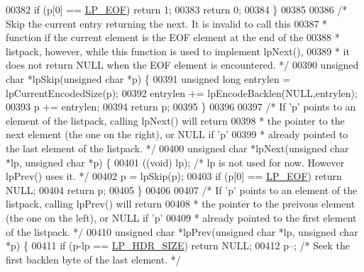 \begin{DoxyCode}
00382     \textcolor{keywordflow}{if} (p[0] == \hyperlink{listpack_8c_aa11b422dc597c4352da2abf522692774}{LP\_EOF}) \textcolor{keywordflow}{return} 1;
00383     \textcolor{keywordflow}{return} 0;
00384 \}
00385 
00386 \textcolor{comment}{/* Skip the current entry returning the next. It is invalid to call this}
00387 \textcolor{comment}{ * function if the current element is the EOF element at the end of the}
00388 \textcolor{comment}{ * listpack, however, while this function is used to implement lpNext(),}
00389 \textcolor{comment}{ * it does not return NULL when the EOF element is encountered. */}
00390 \textcolor{keywordtype}{unsigned} \textcolor{keywordtype}{char} *lpSkip(\textcolor{keywordtype}{unsigned} \textcolor{keywordtype}{char} *p) \{
00391     \textcolor{keywordtype}{unsigned} \textcolor{keywordtype}{long} entrylen = lpCurrentEncodedSize(p);
00392     entrylen += lpEncodeBacklen(NULL,entrylen);
00393     p += entrylen;
00394     \textcolor{keywordflow}{return} p;
00395 \}
00396 
00397 \textcolor{comment}{/* If 'p' points to an element of the listpack, calling lpNext() will return}
00398 \textcolor{comment}{ * the pointer to the next element (the one on the right), or NULL if 'p'}
00399 \textcolor{comment}{ * already pointed to the last element of the listpack. */}
00400 \textcolor{keywordtype}{unsigned} \textcolor{keywordtype}{char} *lpNext(\textcolor{keywordtype}{unsigned} \textcolor{keywordtype}{char} *lp, \textcolor{keywordtype}{unsigned} \textcolor{keywordtype}{char} *p) \{
00401     ((\textcolor{keywordtype}{void}) lp); \textcolor{comment}{/* lp is not used for now. However lpPrev() uses it. */}
00402     p = lpSkip(p);
00403     \textcolor{keywordflow}{if} (p[0] == \hyperlink{listpack_8c_aa11b422dc597c4352da2abf522692774}{LP\_EOF}) \textcolor{keywordflow}{return} NULL;
00404     \textcolor{keywordflow}{return} p;
00405 \}
00406 
00407 \textcolor{comment}{/* If 'p' points to an element of the listpack, calling lpPrev() will return}
00408 \textcolor{comment}{ * the pointer to the preivous element (the one on the left), or NULL if 'p'}
00409 \textcolor{comment}{ * already pointed to the first element of the listpack. */}
00410 \textcolor{keywordtype}{unsigned} \textcolor{keywordtype}{char} *lpPrev(\textcolor{keywordtype}{unsigned} \textcolor{keywordtype}{char} *lp, \textcolor{keywordtype}{unsigned} \textcolor{keywordtype}{char} *p) \{
00411     \textcolor{keywordflow}{if} (p-lp == \hyperlink{listpack_8c_aa3fb94110f69a73ee90b4e63d8524dba}{LP\_HDR\_SIZE}) \textcolor{keywordflow}{return} NULL;
00412     p--; \textcolor{comment}{/* Seek the first backlen byte of the last element. */}

\end{DoxyCode}
